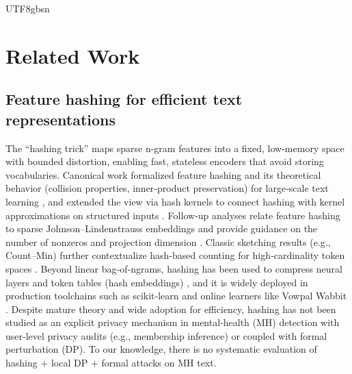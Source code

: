 \documentclass[lettersize,journal]{IEEEtran}
\begin{document}
\begin{CJK*}{UTF8}{gbsn}
\section{Related Work}
\label{sec:related}

\subsection{Feature hashing for efficient text representations}
The ``hashing trick'' maps sparse n\mbox{-}gram features into a fixed, low-memory space with bounded distortion, enabling fast, stateless encoders that avoid storing vocabularies. Canonical work formalized feature hashing and its theoretical behavior (collision properties, inner‑product preservation) for large‑scale text learning \cite{weinberger2009featurehashing}, and extended the view via hash kernels to connect hashing with kernel approximations on structured inputs \cite{shi2009hashkernels,shi2009hashkernelsjmlr}. Follow‑up analyses relate feature hashing to sparse Johnson–Lindenstrauss embeddings and provide guidance on the number of nonzeros and projection dimension \cite{jagadeesan2019sparsejl}. Classic sketching results (e.g., Count–Min) further contextualize hash‑based counting for high‑cardinality token spaces \cite{cormode2005countmin}. Beyond linear bag‑of‑ngrams, hashing has been used to compress neural layers \cite{chen2015hashednets} and token tables (hash embeddings) \cite{svenstrup2017hashembeddings}, and it is widely deployed in production toolchains such as scikit‑learn and online learners like Vowpal Wabbit \cite{scikit2025hashingvectorizer,vowpalwabbit2018}.  Despite mature theory and wide adoption for efficiency, hashing has not been studied as an explicit privacy mechanism in mental‑health (MH) detection with user‑level privacy audits (e.g., membership inference) or coupled with formal perturbation (DP). To our knowledge, there is no systematic evaluation of hashing + local DP + formal attacks on MH text.


\end{CJK*}
\end{document}
